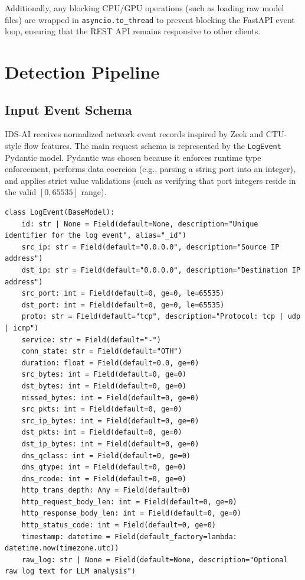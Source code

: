 \documentclass[12pt,a4paper]{report}
\begin{document}
Additionally, any blocking CPU/GPU operations (such as loading raw model files) are wrapped in \texttt{asyncio.to\_thread} to prevent blocking the FastAPI event loop, ensuring that the REST API remains responsive to other clients.
\section{Detection Pipeline}

\subsection{Input Event Schema}

IDS-AI receives normalized network event records inspired by Zeek and CTU-style flow features. The main request schema is represented by the \texttt{LogEvent} Pydantic model. Pydantic was chosen because it enforces runtime type enforcement, performs data coercion (e.g., parsing a string port into an integer), and applies strict value validations (such as verifying that port integers reside in the valid $[0, 65535]$ range).

\begin{lstlisting}[style=pythonstyle, caption={LogEvent validation schema in backend/schemas/schemas.py}]
class LogEvent(BaseModel):
    id: str | None = Field(default=None, description="Unique identifier for the log event", alias="_id")
    src_ip: str = Field(default="0.0.0.0", description="Source IP address")
    dst_ip: str = Field(default="0.0.0.0", description="Destination IP address")
    src_port: int = Field(default=0, ge=0, le=65535)
    dst_port: int = Field(default=0, ge=0, le=65535)
    proto: str = Field(default="tcp", description="Protocol: tcp | udp | icmp")
    service: str = Field(default="-")
    conn_state: str = Field(default="OTH")
    duration: float = Field(default=0.0, ge=0)
    src_bytes: int = Field(default=0, ge=0)
    dst_bytes: int = Field(default=0, ge=0)
    missed_bytes: int = Field(default=0, ge=0)
    src_pkts: int = Field(default=0, ge=0)
    src_ip_bytes: int = Field(default=0, ge=0)
    dst_pkts: int = Field(default=0, ge=0)
    dst_ip_bytes: int = Field(default=0, ge=0)
    dns_qclass: int = Field(default=0, ge=0)
    dns_qtype: int = Field(default=0, ge=0)
    dns_rcode: int = Field(default=0, ge=0)
    http_trans_depth: Any = Field(default=0)
    http_request_body_len: int = Field(default=0, ge=0)
    http_response_body_len: int = Field(default=0, ge=0)
    http_status_code: int = Field(default=0, ge=0)
    timestamp: datetime = Field(default_factory=lambda: datetime.now(timezone.utc))
    raw_log: str | None = Field(default=None, description="Optional raw log text for LLM analysis")
\end{lstlisting}
\end{document}

